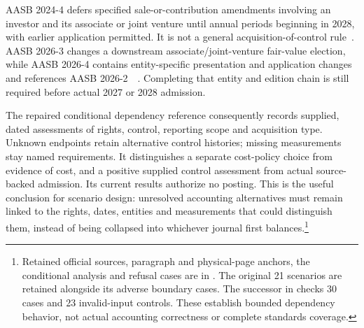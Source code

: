 AASB 2024-4 defers specified sale-or-contribution amendments involving an investor and its associate or joint venture until annual periods beginning in 2028, with earlier application permitted. It is not a general acquisition-of-control rule~\citep[paras.~6--11]{aasb2024controltiming}. AASB 2026-3 changes a downstream associate/joint-venture fair-value election, while AASB 2026-4 contains entity-specific presentation and application changes and references AASB 2026-2~\citep[p.~5]{aasb2026associate}~\citep[paras.~1--3]{aasb2026presentation}. Completing that entity and edition chain is still required before actual 2027 or 2028 admission.

The repaired conditional dependency reference consequently records supplied, dated assessments of rights, control, reporting scope and acquisition type. Unknown endpoints retain alternative control histories; missing measurements stay named requirements. It distinguishes a separate cost-policy choice from evidence of cost, and a positive supplied control assessment from actual source-backed admission. Its current results authorize no posting. This is the useful conclusion for scenario design: unresolved accounting alternatives must remain linked to the rights, dates, entities and measurements that could distinguish them, instead of being collapsed into whichever journal first balances.\footnote{Retained official sources, paragraph and physical-page anchors, the conditional analysis and refusal cases are in . The original 21 scenarios are retained alongside its adverse boundary cases. The successor in  checks 30 cases and 23 invalid-input controls. These establish bounded dependency behavior, not actual accounting correctness or complete standards coverage.}
